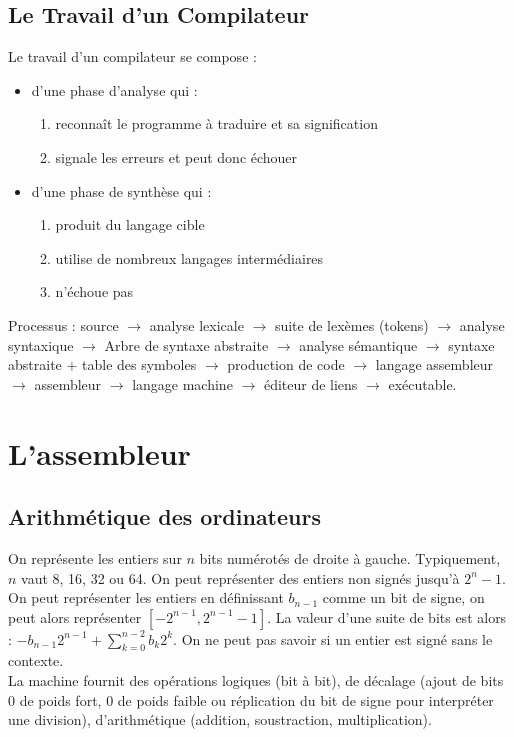 \documentclass{cours}
\begin{document}
\subsection{Le Travail d'un Compilateur}
Le travail d'un compilateur se compose :
\begin{itemize}
    \item d'une phase d'analyse qui :
          \begin{enumerate}
              \item reconnaît le programme à traduire et sa signification
              \item signale les erreurs et peut donc échouer
          \end{enumerate}
    \item d'une phase de synthèse qui :
          \begin{enumerate}
              \item produit du langage cible
              \item utilise de nombreux langages intermédiaires
              \item n'échoue pas
          \end{enumerate}
\end{itemize}
Processus : source $\rightarrow$ analyse lexicale $\rightarrow$ suite de lexèmes (tokens) $\rightarrow$ analyse syntaxique $\rightarrow$ Arbre de syntaxe abstraite $\rightarrow$ analyse sémantique $\rightarrow$ syntaxe abstraite + table des symboles $\rightarrow$ production de code $\rightarrow$ langage assembleur $\rightarrow$ assembleur $\rightarrow$ langage machine $\rightarrow$ éditeur de liens $\rightarrow$ exécutable.

\section{L'assembleur}
\subsection{Arithmétique des ordinateurs}
On représente les entiers sur $n$ bits numérotés de droite à gauche. Typiquement, $n$ vaut 8, 16, 32 ou 64. On peut représenter des entiers non signés jusqu'à $2^{n} - 1$. On peut représenter les entiers en définissant $b_{n-1}$ comme un bit de signe, on peut alors représenter $\left[-2^{n-1}, 2^{n-1}-1\right]$. La valeur d'une suite de bits est alors : $-b_{n-1}2^{n-1} + \sum_{k = 0}^{n-2} b_{k} 2^{k}$. On ne peut pas savoir si un entier est signé sans le contexte. \\
La machine fournit des opérations logiques (bit à bit), de décalage (ajout de bits 0 de poids fort, 0 de poids faible ou réplication du bit de signe pour interpréter une division), d'arithmétique (addition, soustraction, multiplication). \\
\end{document}
